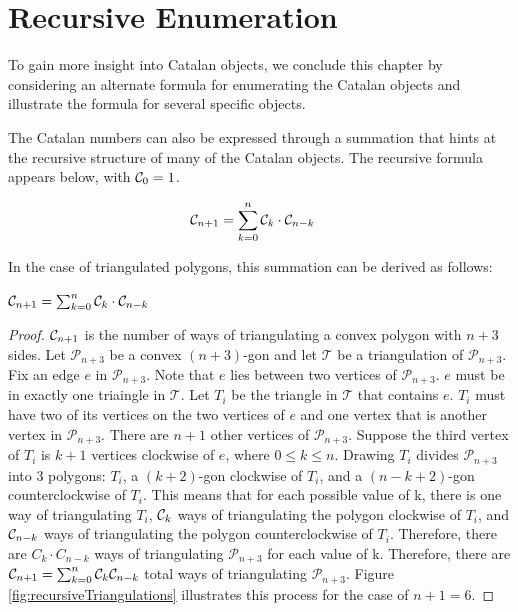 \section{Recursive Enumeration}

To gain more insight into Catalan objects, we conclude this chapter by considering an alternate formula for enumerating the Catalan objects and illustrate the formula for several specific objects.

The Catalan numbers can also be expressed through a summation that hints at the recursive structure of many of the Catalan objects.  
The recursive formula appears below, with $\mathcal{C}_0=1$.

\begin{align}
    \mathcal{C}_{n+1} &= \sum_{k=0}^{n}{\mathcal{C}_{k}\cdot\mathcal{C}_{n-k}}
\end{align} 

In the case of triangulated polygons, this summation can be derived as follows:

\begin{theorem}
    $\mathcal{C}_{n+1} = \sum_{k=0}^{n}{\mathcal{C}_{k}\cdot\mathcal{C}_{n-k}}$
\end{theorem}
\begin{proof}
$\mathcal{C}_{n+1}$ is the number of ways of triangulating a convex polygon with $n+3$ sides.  Let $\mathcal{P}_{n+3}$ be a convex $(n+3)$-gon and let $\mathcal{T}$ be a triangulation of $\mathcal{P}_{n+3}$. Fix an edge $e$ in $\mathcal{P}_{n+3}$.  Note that $e$ lies between two vertices of $\mathcal{P}_{n+3}$. $e$ must be in exactly one triaingle in $\mathcal{T}$.  Let $T_{i}$ be the triangle in $\mathcal{T}$ that contains $e$.  $T_{i}$ must have two of its vertices on the two vertices of $e$ and one vertex that is another vertex in $\mathcal{P}_{n+3}$.  There are $n+1$ other vertices of $\mathcal{P}_{n+3}$.  Suppose the third vertex of $T_i$ is $k+1$ vertices clockwise of $e$, where $0\le k \le n$. Drawing $T_i$ divides $\mathcal{P}_{n+3}$ into 3 polygons: $T_i$, a $(k+2)$-gon clockwise of $T_i$, and a $(n-k+2)$-gon counterclockwise of $T_i$. This means that for each possible value of k, there is one way of triangulating $T_i$, $\mathcal{C}_k$ ways of triangulating the polygon clockwise of $T_i$, and $\mathcal{C}_{n-k}$ ways of triangulating the polygon counterclockwise of $T_i$.  Therefore, there are $C_k\cdot C_{n-k}$ ways of triangulating $\mathcal{P}_{n+3}$ for each value of k.  Therefore, there are $\mathcal{C}_{n+1}=\sum_{k=0}^{n}{\mathcal{C}_{k}\mathcal{C}_{n-k}}$ total ways of triangulating $\mathcal{P}_{n+3}$. Figure \ref{fig:recursiveTriangulations} illustrates this process for the case of $n+1=6$.
\end{proof}



